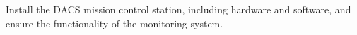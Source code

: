 Install the DACS mission control station, including hardware and software, and ensure the functionality of the monitoring system.
